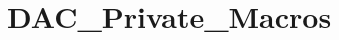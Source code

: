 \hypertarget{group___d_a_c___private___macros}{}\section{D\+A\+C\+\_\+\+Private\+\_\+\+Macros}
\label{group___d_a_c___private___macros}
